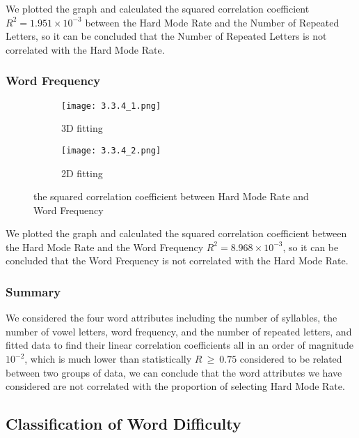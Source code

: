 \documentclass[12pt]{article}  %
\begin{document}
We plotted the graph and calculated the squared correlation coefficient $R^{2}=1.951 \times   10^{-3}$ between the Hard Mode Rate and the Number of Repeated Letters, so it can be concluded that the Number of Repeated Letters is not correlated with the Hard Mode Rate.

\subsubsection{Word Frequency}


            \begin{figure*}[h]
                \centering
                \begin{subfigure}[b]{0.4\textwidth}
                    \texttt{[image: 3.3.4\_1.png]}
                    \caption{3D fitting}
                \end{subfigure}
                \begin{subfigure}[b]{0.4\textwidth}
                    \texttt{[image: 3.3.4\_2.png]}
                    \caption{2D fitting}
                \end{subfigure}
                \caption{the squared correlation coefficient between Hard Mode Rate and Word Frequency}
            \end{figure*}

We plotted the graph and calculated the squared correlation coefficient between the Hard Mode Rate and the Word Frequency  $R^{2}=8.968 \times   10^{-3}$, so it can be concluded that the Word Frequency is not correlated with the Hard Mode Rate.

\subsubsection{Summary}
We considered the four word attributes including the number of syllables, the number of vowel letters, word frequency, and the number of repeated letters, and fitted data to find their linear correlation coefficients all in an order of magnitude $10^{-2}$, which is much lower than statistically $R\  \geq \ 0.75$ considered to be related between two groups of data, we can conclude that the word attributes we have considered are not correlated with the proportion of selecting Hard Mode Rate.


\subsection{Classification of Word Difficulty}
\end{document}
